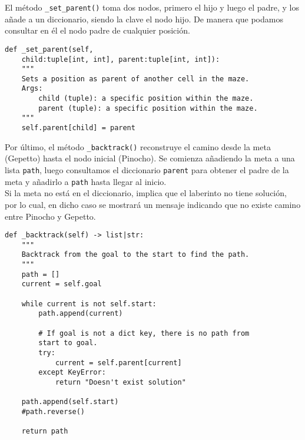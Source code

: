 El método \lstinline{_set_parent()} toma dos nodos, primero el hijo y luego el padre, y los añade a un diccionario, siendo la clave el nodo hijo. De manera que podamos consultar en él el nodo padre de cualquier posición.\\
\begin{lstlisting}
def _set_parent(self,
    child:tuple[int, int], parent:tuple[int, int]):
    """
    Sets a position as parent of another cell in the maze.
    Args:
        child (tuple): a specific position within the maze.
        parent (tuple): a specific position within the maze.
    """
    self.parent[child] = parent
\end{lstlisting}
\clearpage
Por último, el método \lstinline{_backtrack()} reconstruye el camino desde la meta (Gepetto) hasta el nodo inicial (Pinocho). Se comienza añadiendo la meta a una lista \lstinline{path}, luego consultamos el diccionario \lstinline{parent} para obtener el padre de la meta y añadirlo a \lstinline{path} hasta llegar al inicio.
\\\newline
Si la meta no está en el diccionario, implica que el laberinto no tiene solución, por lo cual, en dicho caso se mostrará un mensaje indicando que no existe camino entre Pinocho y Gepetto.\\
\begin{lstlisting}
def _backtrack(self) -> list|str:
    """
    Backtrack from the goal to the start to find the path.
    """
    path = []
    current = self.goal

    while current is not self.start:
        path.append(current)

        # If goal is not a dict key, there is no path from
        start to goal.
        try:
            current = self.parent[current]
        except KeyError:
            return "Doesn't exist solution"

    path.append(self.start)
    #path.reverse()

    return path
\end{lstlisting}
\clearpage